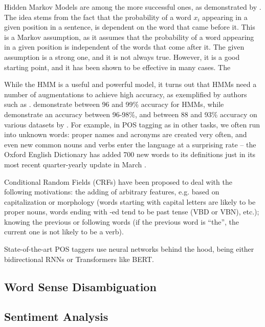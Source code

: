 Hidden Markov Models are among the more successful ones, as demonstrated by \cite{schutze1994part,thede1999second,nigam1999maximumentropy}. The idea stems from the fact that the probability of a word $x_i$ appearing in a given position in a sentence, is dependent on the word that came before it. This is a Markov assumption, as it assumes that the probability of a word appearing in a given position is independent of the words that come after it. The given assumption is a strong one, and it is not always true. However, it is a good starting point, and it has been shown to be effective in many cases. The 

While the HMM is a useful and powerful model, it turns out that HMMs need a number of augmentations to achieve high accuracy, as exemplified by authors such as \cite{goldberg2008can}. \cite{10.3115/974147.974178postaggingmarkov} demonstrate between 96 and 99\% accuracy for HMMs, while \cite{thede1999second} demonstrate an accuracy between 96-98\%, and between 88 and 93\% accuracy on various datasets by \cite{goldberg2008can}. For example, in POS tagging as in other tasks, we often run into unknown words: proper names and acronyms are created very often, and even new common nouns and verbs enter the language at a surprising rate -- the Oxford English Dictionary has added 700 new words to its definitions just in its most recent quarter-yearly update in March \citep{oed2023englishupdates}. 

Conditional Random Fields (CRFs) have been proposed to deal with the following motivations: the adding of arbitrary features, e.g. based on capitalization or morphology (words starting with capital letters are likely to be proper nouns, words ending with -ed tend to be past tense (VBD or VBN), etc.); knowing the previous or following words (if the previous word is ``the'', the current one is not likely to be a verb).

State-of-the-art POS taggers use neural networks behind the hood, being either bidirectional RNNs or Transformers like BERT. 

\subsection{Word Sense Disambiguation}

\subsection{Sentiment Analysis}


